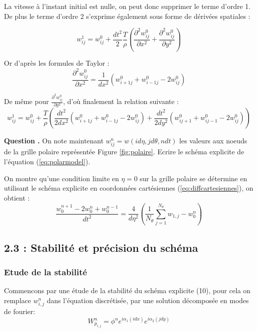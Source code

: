 \documentclass[a4,12pt]{article}
\newcounter{Nbquestion}
\newcommand*\question{%
  \stepcounter{Nbquestion}%
  \textbf{Question \theNbquestion. }}
\begin{document}
			      La vitesse à l'instant initial est nulle, on peut donc supprimer le
			      terme d'ordre 1. De plus le terme d'ordre 2 s'exprime également sous
			      forme de dérivées spatiales :

			      \[
				w_{ij}^1 = w_{ij}^0 +
				\frac{dt^2}{2}\frac{T}{\rho}\left(\frac{\partial^2 w_{ij}^0}{\partial x^2} +
				\frac{\partial^2 w_{ij}^0}{\partial y^2} \right)
			      \]

			      Or d'après les formules de Taylor :
			      \[
				\frac{\partial^2
				  w_{ij}^0}{\partial x^2} = \frac{1}{dx^2}(w_{i+1 j}^0 + w_{i-1 j}^0 -2w_{i j}^0)
				\]

				De même pour $\frac{\partial^2 w_{ij}^0}{\partial y^2}$, d'où finalement la relation suivante :
				\[
				  w_{ij}^1 = w_{ij}^0 + \frac{T}{\rho}\left(\frac{dt^2}{2dx^2}(w_{i+1 j}^0 + w_{i-1 j}^0 -2w_{i j}^0)+\frac{dt^2}{2dy^2}(w_{i j+1}^0 + w_{i j-1}^0 -2w_{i j}^0)\right) 
				\]




				\question On note maintenant $w_{ij}^{n}=w(id\eta,jd\theta,ndt)$ les valeurs aux noeuds de la grille polaire représentée Figure \ref{fig:polaire}. Ecrire le schéma explicite de l'équation (\ref{eq:polarmodel}).


				On montre qu'une condition limite en $\eta=0$ sur la grille polaire se détermine en utilisant le schéma explicite en coordonnées cartésiennes (\ref{eq:diffcartesiennes}), on obtient :
				\[
				  \dfrac{w_0^{n+1}-2 w_0^{n}+ w_{0}^{n-1}}{dt^2}=\dfrac{4}{d \eta^2}\left(\frac{1}{N_\theta} \sum_{j=1}^{N_\theta} w_{1,j}-w_{0}^{n}\right)
				\]

				\subsection*{2.3 : Stabilité et précision du schéma}

				\subsubsection{Etude de la stabilité}
				Commencons par une étude de la stabilité du schéma explicite (10), pour cela on remplace $w_{i,j}^{n}$ dans l'équation discrétisée, par une solution décomposée en modes de fourier: 
				\[
				  W_{p_{i,j}}^{n}=\phi^n e^{i\alpha_1(idx)}e^{i\alpha_2(jdy)}
				\]
\end{document}
